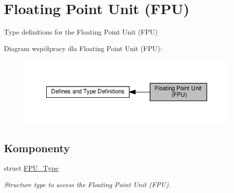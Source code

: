 \hypertarget{group___c_m_s_i_s___f_p_u}{}\section{Floating Point Unit (F\+PU)}
\label{group___c_m_s_i_s___f_p_u}


Type definitions for the Floating Point Unit (F\+PU)  


Diagram współpracy dla Floating Point Unit (F\+PU)\+:\nopagebreak
\begin{figure}[H]
\begin{center}
\leavevmode
\includegraphics[width=350pt]{group___c_m_s_i_s___f_p_u}
\end{center}
\end{figure}
\subsection*{Komponenty}
\begin{DoxyCompactItemize}
\item 
struct \hyperlink{struct_f_p_u___type}{F\+P\+U\+\_\+\+Type}
\begin{DoxyCompactList}\small\item\em Structure type to access the Floating Point Unit (F\+PU). \end{DoxyCompactList}\end{DoxyCompactItemize}
